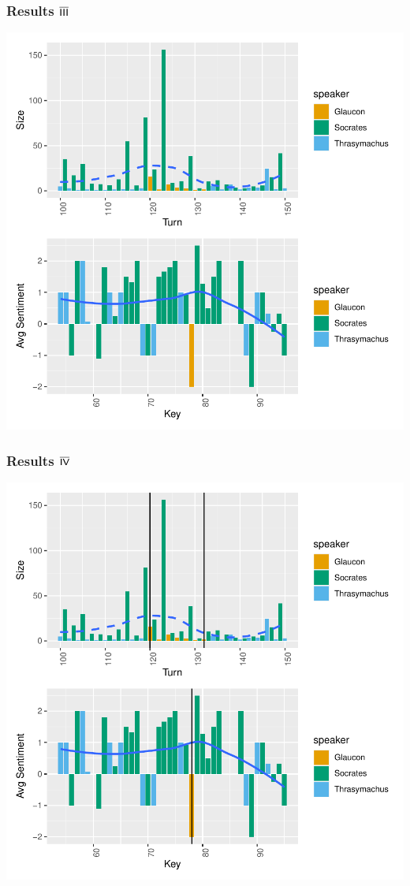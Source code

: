 \documentclass{beamer}
\renewcommand{\Roman}[1]{$\overline{\textsf{\small{\MakeUppercase{\romannumeral #1}}}}$}
\begin{document}
\begin{frame}[fragile]
\frametitle{Results \Roman{3}}

\includegraphics{GreatSlideshow-019}
\end{frame}



\begin{frame}[fragile]
\frametitle{Results \Roman{4}}

\includegraphics{GreatSlideshow-021}
\end{frame}
\end{document}
